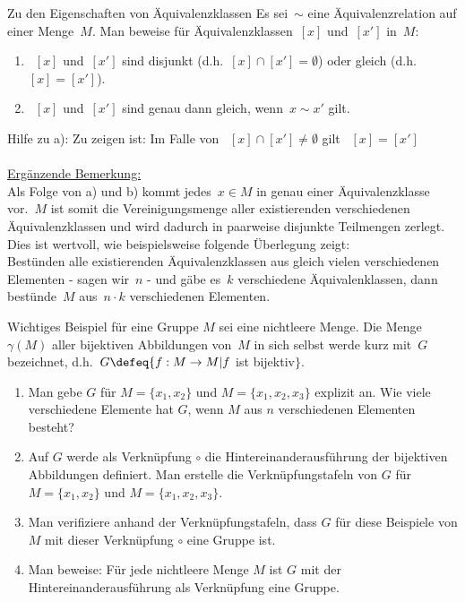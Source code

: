 \documentclass{uebblatt}
\begin{document}

\begin{aufgabe}{Zu den Eigenschaften von Äquivalenzklassen}
Es sei~$\sim$ eine Äquivalenzrelation auf einer Menge~$M$. Man beweise für Äquivalenzklassen~$[x]$ und~$[x']$ in~$M$:
\begin{enumerate}
\item ~$[x]$ und~$[x']$ sind disjunkt (d.h.~$[x] \cap [x'] = \emptyset$) oder gleich (d.h.~$[x] = [x']$).
\item ~$[x]$ und~$[x']$ sind genau dann gleich, wenn~$x \sim x'$ gilt.
\end{enumerate}
Hilfe zu a): Zu zeigen ist: Im Falle von ~$[x] \cap [x'] \neq \emptyset$ gilt ~$[x] = [x']$\\
\\
\underline{Ergänzende Bemerkung:}\\
Als Folge von a) und b) kommt jedes~$x \in M$ in genau einer Äquivalenzklasse vor.~$M$ ist somit die Vereinigungsmenge aller existierenden verschiedenen Äquivalenzklassen und wird dadurch in paarweise disjunkte Teilmengen zerlegt. Dies ist wertvoll, wie beispielsweise folgende Überlegung zeigt:\\
Bestünden alle existierenden Äquivalenzklassen aus gleich vielen verschiedenen Elementen - sagen wir~$n$ - und gäbe es~$k$ verschiedene Äquivalenklassen, dann bestünde~$M$ aus~$n \cdot k$ verschiedenen Elementen.\\
\end{aufgabe}

\begin{aufgabe}{Wichtiges Beispiel für eine Gruppe}
$M$ sei eine nichtleere Menge. Die Menge~$\gamma(M)$ aller bijektiven Abbildungen von~$M$ in sich selbst werde kurz mit~$G$ bezeichnet, d.h.~$G \defeq \{f:M \to M | f$ ist bijektiv$\}$.
\begin{enumerate}
\item Man gebe $G$ für $M = \{x_1, x_2\}$ und $M = \{x_1, x_2, x_3\}$ explizit an. Wie viele verschiedene Elemente hat $G$, wenn $M$ aus $n$ verschiedenen Elementen besteht?
\item Auf $G$ werde als Verknüpfung $\circ$ die Hintereinanderausführung der bijektiven Abbildungen definiert. Man erstelle die Verknüpfungstafeln von $G$ für\\$M = \{x_1, x_2\}$ und $M = \{x_1, x_2, x_3\}$.
\item Man verifiziere anhand der Verknüpfungstafeln, dass $G$ für diese Beispiele von $M$ mit dieser Verknüpfung $\circ$ eine Gruppe ist.
\item Man beweise: Für jede nichtleere Menge $M$ ist $G$ mit der Hintereinanderausführung als Verknüpfung eine Gruppe.
\end{enumerate}
\end{aufgabe}
\end{document}

